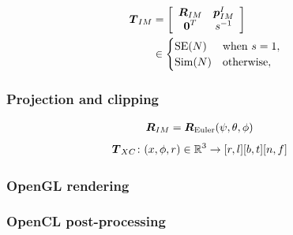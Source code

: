 \begin{align}
\dvec{T}_{IM} &= 
\left[\begin{array}{c c}
 \mat{R}_{IM}  & \dvec{p}_{IM}^I \\%
 \dvec{0}^T  &  s^{-1}
\end{array}\right] \nn &\in
\begin{cases}
\mathrm{SE}(N) & \mathrm{when}\ s=1,\\
\mathrm{Sim}(N) & \mathrm{otherwise},
\end{cases} 
\end{align}





\subsubsection{Projection and clipping}

\begin{align}
\dvec{R}_{IM} &= \dvec{R}_{\mathrm{Euler}}(\psi,\theta,\phi)\label{eq_R_IM}
\end{align}
\begin{align}
\boldsymbol{T}_{XC}&\colon (x,\phi,r)\in\mathbb{R}^3 \to [r,l][b,t][n,f]
\end{align}

\subsubsection{OpenGL rendering}



\subsubsection{OpenCL post-processing}


%
























